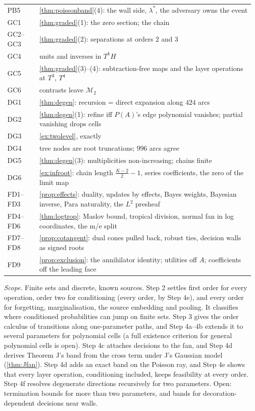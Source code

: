 \documentclass[11pt]{article}
\theoremstyle{definition}\newtheorem{definition}[theorem]{Definition}\newtheorem{remark}[theorem]{Remark}\newtheorem{example}[theorem]{Example}
\begin{document}
\begin{center}
\begin{tabular}{lp{}}
PB5 & \cref{thm:poissonband}(4): the wall side, $\lambda^*$, the adversary owns the event\\
GC1 & \cref{thm:graded}(1): the zero section; the chain\\
GC2--GC3 & \cref{thm:graded}(2): separations at orders $2$ and $3$\\
GC4 & units and inverses in $T^kH$\\
GC5 & \cref{thm:graded}(3)--(4): subtraction-free maps and the layer operations at $T^3$, $T^4$\\
GC6 & contrasts leave $\mathcal M_2$\\\midrule
DG1 & \cref{thm:degen}: recursion = direct expansion along $424$ arcs\\
DG2 & \cref{thm:degen}(1): refine iff $P(A)$'s edge polynomial vanishes; partial vanishing drops cells\\
DG3 & \cref{ex:twolevel}, exactly\\
DG4 & tree nodes are root truncations; $996$ arcs agree\\
DG5 & \cref{thm:degen}(3): multiplicities non-increasing; chains finite\\
DG6 & \cref{ex:infroot}: chain length $\tfrac{K-2}2-1$, series coefficients, the zero of the limit map\\\midrule
FD1--FD3 & \cref{prop:effects}: duality, updates by effects, Bayes weights, Bayesian inverse, Para naturality, the $L^2$ presheaf\\
FD4--FD6 & \cref{thm:logtrop}: Maslov bound, tropical division, normal fan in log coordinates, the m/e split\\
FD7--FD8 & \cref{prop:cotangent}: dual cones pulled back, robust ties, decision walls as signed roots\\
FD9 & \cref{prop:exclusion}: the annihilator identity; utilities off $A$; coefficients off the leading face\\\bottomrule
\end{tabular}
\end{center}
\emph{Scope.} Finite sets and discrete, known sources. Step 2 settles first order for every operation, order two for conditioning (every order, by Step 4e), and
every order for forgetting, marginalisation, the source embedding and pooling. It classifies where conditioned probabilities can
jump on finite sets. Step 3 gives the order calculus of transitions along one-parameter paths, and Step 4a--4b extends it to several
parameters for polynomial cells (a full existence criterion for general polynomial cells is open). Step 4c attaches decisions to the fan, and Step 4d derives Theorem J's band from the cross term under J's Gaussian model
(\cref{thm:Jfan}). Step 4d adds an exact band on the Poisson ray, and Step 4e shows that every layer
operation, conditioning included, keeps feasibility at every order. Step 4f resolves degenerate directions recursively for two parameters. Open: termination
bounds for more than two parameters, and bands for decoration-dependent decisions near walls.
\end{document}
